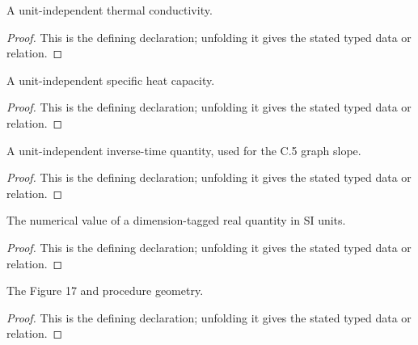 \begin{definition}[DimThermalConductivity]
  \label{decl:physics:IPhO_2026_4_C_7:DimThermalConductivity}
  A unit-independent thermal conductivity.
\end{definition}
\begin{proof}
  This is the defining declaration; unfolding it gives the stated typed data or relation.
\end{proof}

\begin{definition}[DimSpecificHeatCapacity]
  \label{decl:physics:IPhO_2026_4_C_7:DimSpecificHeatCapacity}
  A unit-independent specific heat capacity.
\end{definition}
\begin{proof}
  This is the defining declaration; unfolding it gives the stated typed data or relation.
\end{proof}

\begin{definition}[DimInverseTime]
  \label{decl:physics:IPhO_2026_4_C_7:DimInverseTime}
  A unit-independent inverse-time quantity, used for the C.5 graph slope.
\end{definition}
\begin{proof}
  This is the defining declaration; unfolding it gives the stated typed data or relation.
\end{proof}

\begin{definition}[siValue]
  \label{decl:physics:IPhO_2026_4_C_7:siValue}
  The numerical value of a dimension-tagged real quantity in SI units.
\end{definition}
\begin{proof}
  This is the defining declaration; unfolding it gives the stated typed data or relation.
\end{proof}

\begin{definition}[ApparatusGeometry]
  \label{decl:physics:IPhO_2026_4_C_7:ApparatusGeometry}
  The Figure 17 and procedure geometry.
\end{definition}
\begin{proof}
  This is the defining declaration; unfolding it gives the stated typed data or relation.
\end{proof}

